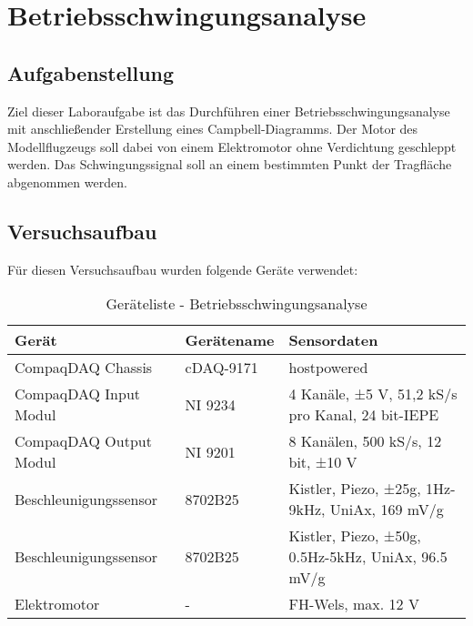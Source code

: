 \chapter{Betriebsschwingungsanalyse}
\label{sec: Hauptkapitel 2}


\section{Aufgabenstellung}
    Ziel dieser Laboraufgabe ist das Durchführen einer Betriebsschwingungsanalyse
    mit anschließender Erstellung eines Campbell-Diagramms. Der Motor des
    Modellflugzeugs soll dabei von einem Elektromotor ohne Verdichtung
    geschleppt werden. Das Schwingungssignal soll an einem bestimmten Punkt der
    Tragfläche abgenommen werden.

\section{Versuchsaufbau}
    Für diesen Versuchsaufbau wurden folgende Geräte verwendet:

    \begin{table}[H]
        \centering
        \begin{tabular}{|l|l|p{6cm}|}
            \hline
            \textbf{Gerät}  &   \textbf{Gerätename}   &   \textbf{Sensordaten} \\
            \hline \hline
            CompaqDAQ Chassis & cDAQ-9171 & hostpowered \\
            \hline
            CompaqDAQ Input Modul & NI 9234 & 4 Kanäle, ±5 V, 51,2 kS/s pro Kanal, 24 bit-IEPE  \\
            \hline
            CompaqDAQ Output Modul & NI 9201 & 8 Kanälen, 500 kS/s, 12 bit, ±10 V   \\
            \hline
            Beschleunigungssensor & 8702B25 & Kistler, Piezo, ±25g, 1Hz-9kHz, UniAx, 169 mV/g  \\
            \hline
            Beschleunigungssensor & 8702B25 & Kistler, Piezo, ±50g, 0.5Hz-5kHz, UniAx, 96.5 mV/g  \\
            \hline
            Elektromotor & - & FH-Wels, max. 12 V \\
            \hline
        \end{tabular}
        \caption{Geräteliste - Betriebsschwingungsanalyse}
        \label{tab: Geräteliste_BSA}
    \end{table}

